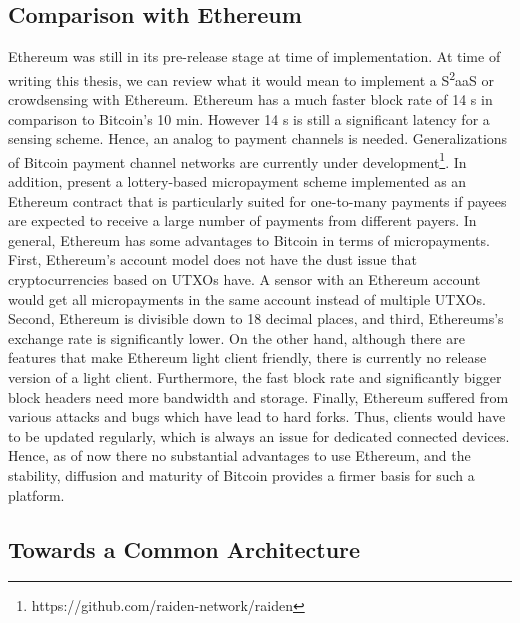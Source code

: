 \subsection{Comparison with Ethereum}

Ethereum was still in its pre-release stage at time of implementation. At time of writing this thesis, we can review what it would mean to implement a S\textsuperscript{2}aaS or crowdsensing with Ethereum. Ethereum has a much faster block rate of 14 s in comparison to Bitcoin's 10 min. However 14 s is still a significant latency for a sensing scheme. Hence, an analog to payment channels is needed. Generalizations of Bitcoin payment channel networks are currently under development\footnote{https://github.com/raiden-network/raiden}. In addition, \cite{golemnano2015} present a lottery-based micropayment scheme implemented as an Ethereum contract that is particularly suited for one-to-many payments if payees are expected to receive a large number of payments from different payers.
In general, Ethereum has some advantages to Bitcoin in terms of micropayments. First, Ethereum's account model does not have the dust issue that cryptocurrencies based on \ac{UTXO}s have. A sensor with an Ethereum account would get all micropayments in the same account instead of multiple \ac{UTXO}s. Second, Ethereum is divisible down to 18 decimal places, and third, Ethereums's exchange rate is significantly lower. On the other hand, although there are features that make Ethereum light client friendly, there is currently no release version of a light client. Furthermore, the fast block rate and significantly bigger block headers need more bandwidth and storage. Finally, Ethereum suffered from various attacks and bugs which have lead to hard forks. Thus, clients would have to be updated regularly, which is always an issue for dedicated connected devices. 
Hence, as of now there no substantial advantages to use Ethereum, and the stability, diffusion and maturity of Bitcoin provides a firmer basis for such a platform.


\subsection{Towards a Common Architecture}

